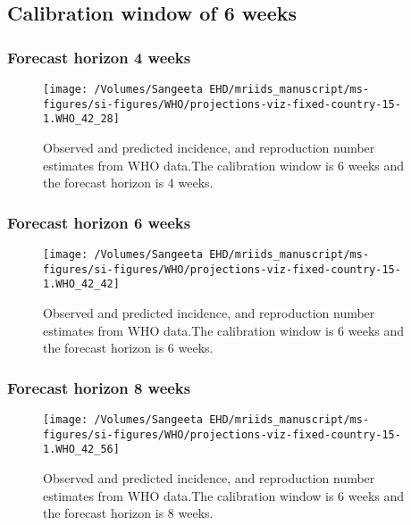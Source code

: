 \documentclass[11pt,]{article}
\begin{document}
\hypertarget{calibration-window-of-6-weeks-2}{%
  \subsection{Calibration window of 6
    weeks}\label{calibration-window-of-6-weeks-2}}

\hypertarget{forecast-horizon-4-weeks-7}{%
  \subsubsection{Forecast horizon 4
    weeks}\label{forecast-horizon-4-weeks-7}}

\begin{figure}

  {\centering \texttt{[image: /Volumes/Sangeeta EHD/mriids\_manuscript/ms-figures/si-figures/WHO/projections-viz-fixed-country-15-1.WHO\_42\_28]} 

  }

  \caption{Observed and predicted incidence, and reproduction number estimates from WHO data.The calibration window is 6 weeks and the forecast horizon is 4 weeks.}\label{fig:SI-28}
\end{figure}

\hypertarget{forecast-horizon-6-weeks-8}{%
  \subsubsection{Forecast horizon 6
    weeks}\label{forecast-horizon-6-weeks-8}}

\begin{figure}

  {\centering \texttt{[image: /Volumes/Sangeeta EHD/mriids\_manuscript/ms-figures/si-figures/WHO/projections-viz-fixed-country-15-1.WHO\_42\_42]} 

  }

  \caption{Observed and predicted incidence, and reproduction number estimates from WHO data.The calibration window is 6 weeks and the forecast horizon is 6 weeks.}\label{fig:SI-29}
\end{figure}

\hypertarget{forecast-horizon-8-weeks-8}{%
  \subsubsection{Forecast horizon 8
    weeks}\label{forecast-horizon-8-weeks-8}}

\begin{figure}

  {\centering \texttt{[image: /Volumes/Sangeeta EHD/mriids\_manuscript/ms-figures/si-figures/WHO/projections-viz-fixed-country-15-1.WHO\_42\_56]} 

  }

  \caption{Observed and predicted incidence, and reproduction number estimates from WHO data.The calibration window is 6 weeks and the forecast horizon is 8 weeks.}\label{fig:SI-30}
\end{figure}
\end{document}
